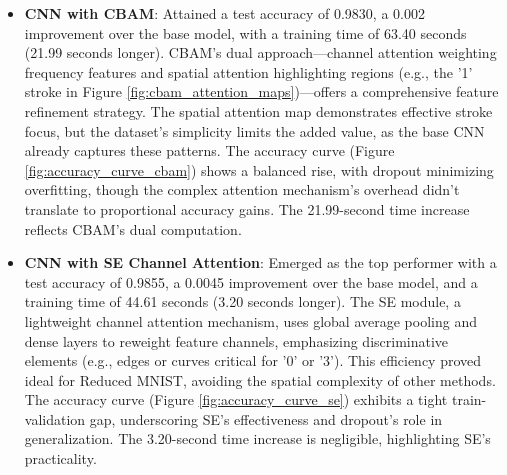 \documentclass[12pt]{article}
\begin{document}
\begin{itemize}
    \item \textbf{CNN with CBAM}: Attained a test accuracy of 0.9830, a 0.002 improvement over the base model, with a training time of 63.40 seconds (21.99 seconds longer). CBAM's dual approach—channel attention weighting frequency features and spatial attention highlighting regions (e.g., the '1' stroke in Figure \ref{fig:cbam_attention_maps})—offers a comprehensive feature refinement strategy. The spatial attention map demonstrates effective stroke focus, but the dataset's simplicity limits the added value, as the base CNN already captures these patterns. The accuracy curve (Figure \ref{fig:accuracy_curve_cbam}) shows a balanced rise, with dropout minimizing overfitting, though the complex attention mechanism's overhead didn't translate to proportional accuracy gains. The 21.99-second time increase reflects CBAM's dual computation.
    
    \item \textbf{CNN with SE Channel Attention}: Emerged as the top performer with a test accuracy of 0.9855, a 0.0045 improvement over the base model, and a training time of 44.61 seconds (3.20 seconds longer). The SE module, a lightweight channel attention mechanism, uses global average pooling and dense layers to reweight feature channels, emphasizing discriminative elements (e.g., edges or curves critical for '0' or '3'). This efficiency proved ideal for Reduced MNIST, avoiding the spatial complexity of other methods. The accuracy curve (Figure \ref{fig:accuracy_curve_se}) exhibits a tight train-validation gap, underscoring SE's effectiveness and dropout's role in generalization. The 3.20-second time increase is negligible, highlighting SE's practicality.
\end{itemize}
\end{document}
